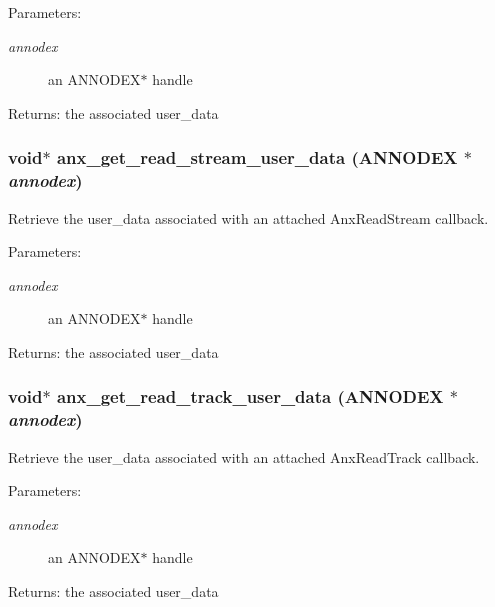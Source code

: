 \begin{Desc}
\item[Parameters:]
\begin{description}
\item[{\em annodex}]an ANNODEX$\ast$ handle \end{description}
\end{Desc}
\begin{Desc}
\item[Returns:]the associated user\_\-data \end{Desc}
\subsubsection{\setlength{\rightskip}{0pt plus 5cm}void$\ast$ anx\_\-get\_\-read\_\-stream\_\-user\_\-data ({\bf ANNODEX} $\ast$ {\em annodex})}\label{anx__read_8h_a6}


Retrieve the user\_\-data associated with an attached Anx\-Read\-Stream callback. 

\begin{Desc}
\item[Parameters:]
\begin{description}
\item[{\em annodex}]an ANNODEX$\ast$ handle \end{description}
\end{Desc}
\begin{Desc}
\item[Returns:]the associated user\_\-data \end{Desc}
\subsubsection{\setlength{\rightskip}{0pt plus 5cm}void$\ast$ anx\_\-get\_\-read\_\-track\_\-user\_\-data ({\bf ANNODEX} $\ast$ {\em annodex})}\label{anx__read_8h_a8}


Retrieve the user\_\-data associated with an attached Anx\-Read\-Track callback. 

\begin{Desc}
\item[Parameters:]
\begin{description}
\item[{\em annodex}]an ANNODEX$\ast$ handle \end{description}
\end{Desc}
\begin{Desc}
\item[Returns:]the associated user\_\-data \end{Desc}
